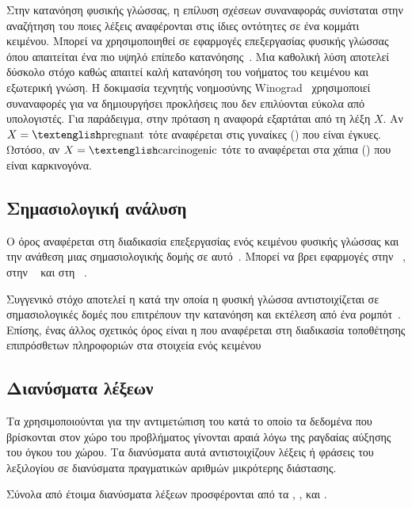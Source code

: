 Στην κατανόηση φυσικής γλώσσας, η επίλυση σχέσεων συναναφοράς συνίσταται στην αναζήτηση του ποιες λέξεις αναφέρονται στις ίδιες οντότητες σε ένα κομμάτι κειμένου.
Μπορεί να χρησιμοποιηθεί σε εφαρμογές επεξεργασίας φυσικής γλώσσας όπου απαιτείται ένα πιο υψηλό επίπεδο κατανόησης~\cite{peng2015solving}.
Μια καθολική λύση αποτελεί δύσκολο στόχο καθώς απαιτεί καλή κατανόηση του νοήματος του κειμένου και εξωτερική γνώση.
Η δοκιμασία τεχνητής νοημοσύνης Winograd~\cite{levesque2012winograd} χρησιμοποιεί συναναφορές για να δημιουργήσει προκλήσεις που δεν επιλύονται εύκολα από υπολογιστές.
Για παράδειγμα, στην πρόταση  η αναφορά  εξαρτάται από τη λέξη $X$.
Αν $X = \text{\en{pregnant}}$ τότε αναφέρεται στις γυναίκες () που είναι έγκυες.
Ωστόσο, αν $X = \text{\en{carcinogenic}}$ τότε το  αναφέρεται στα χάπια () που είναι καρκινογόνα.

\subsection{Σημασιολογική ανάλυση}
Ο όρος  αναφέρεται στη διαδικασία επεξεργασίας ενός κειμένου φυσικής γλώσσας και την ανάθεση μιας σημασιολογικής δομής σε αυτό~\cite{martin2009speech}.
Μπορεί να βρει εφαρμογές
στην ~\cite{berant2013semantic},
στην ~\cite{rabinovich2017abstract,yin2017syntactic}
και στη ~\cite{andreas2013semantic}.

Συγγενικό στόχο αποτελεί η  κατά την οποία η φυσική γλώσσα αντιστοιχίζεται σε σημασιολογικές δομές που επιτρέπουν την κατανόηση και εκτέλεση από ένα ρομπότ~\cite{matuszek2013learning}.
Επίσης, ένας άλλος σχετικός όρος είναι η  που αναφέρεται στη διαδικασία τοποθέτησης επιπρόσθετων πληροφοριών στα στοιχεία ενός κειμένου

\subsection{Διανύσματα λέξεων}
Τα  χρησιμοποιούνται για την αντιμετώπιση του  κατά το οποίο τα δεδομένα που βρίσκονται στον χώρο του προβλήματος γίνονται αραιά λόγω της ραγδαίας αύξησης του όγκου του χώρου.
Τα διανύσματα αυτά αντιστοιχίζουν λέξεις ή φράσεις του λεξιλογίου σε διανύσματα πραγματικών αριθμών μικρότερης διάστασης.

Σύνολα από έτοιμα διανύσματα λέξεων προσφέρονται από τα , ,  και .


